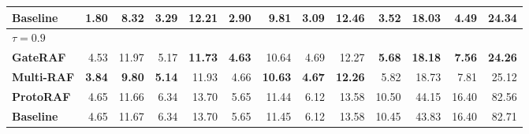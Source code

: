 \begin{table}[t]
\begin{tabular}{lrrrrrrrrrrrr}
        \quad \textbf{Baseline} & 1.80 & 8.32 & 3.29 & 12.21 & 2.90 & 9.81 & 3.09 & 12.46 & 3.52 & 18.03 & 4.49 & 24.34 \\
        \hline
        \multicolumn{13}{l}{$\tau=0.9$} \\
        \quad \textbf{GateRAF} & 4.53 & 11.97 & 5.17 & \textbf{11.73} & \textbf{4.63} & 10.64 & 4.69 & 12.27 & \textbf{5.68} & \textbf{18.18} & \textbf{7.56} & \textbf{24.26} \\
        \quad \textbf{Multi-RAF} & \textbf{3.84} & \textbf{9.80} & \textbf{5.14} & 11.93 & 4.66 & \textbf{10.63} & \textbf{4.67} & \textbf{12.26} & 5.82 & 18.73 & 7.81 & 25.12 \\
        \quad \textbf{ProtoRAF} & 4.65 & 11.66 & 6.34 & 13.70 & 5.65 & 11.44 & 6.12 & 13.58 & 10.50 & 44.15 & 16.40 & 82.56 \\
        \quad \textbf{Baseline} & 4.65 & 11.67 & 6.34 & 13.70 & 5.65 & 11.45 & 6.12 & 13.58 & 10.45 & 43.83 & 16.40 & 82.71 \\
        \hline
    \end{tabular}
\end{table}
